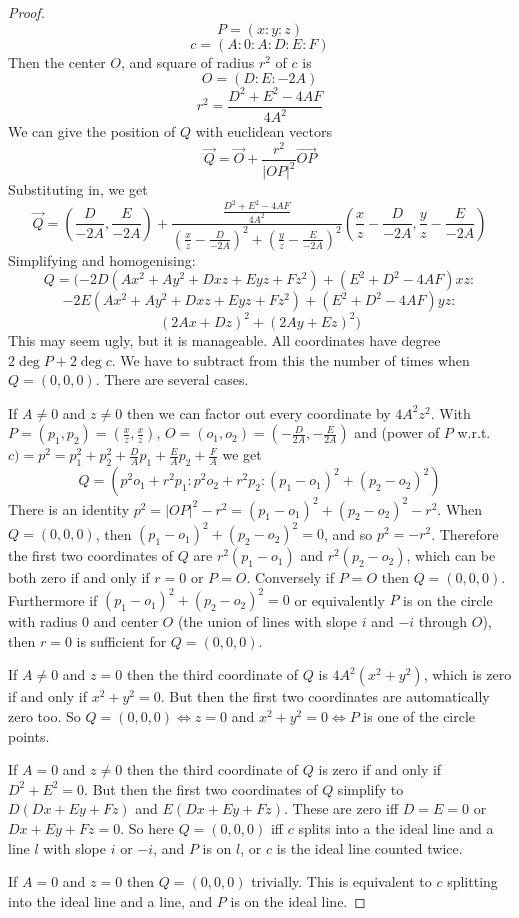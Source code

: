 \documentclass[a4paper]{article}
\begin{document}
\begin{proof}
    $$P=(x:y:z)$$
    $$c=(A:0:A:D:E:F)$$
    Then the center $O$, and square of radius $r^2$ of $c$ is
    $$O=(D:E:-2A)$$
    $$r^2=\frac{D^2+E^2-4AF}{4A^2}$$
    We can give the position of $Q$ with euclidean vectors
    $$\vec{Q}=\vec{O}+\frac{r^2}{|OP|^2}\overrightarrow{OP}$$
    Substituting in, we get
    $$\vec{Q}=\left(\frac{D}{-2A},\frac{E}{-2A}\right)+\frac{\frac{D^2+E^2-4AF}{4A^2}}{\left(\frac{x}{z}-\frac{D}{-2A}\right)^2+\left(\frac{y}{z}-\frac{E}{-2A}\right)^2}\left(\frac{x}{z}-\frac{D}{-2A},\frac{y}{z}-\frac{E}{-2A}\right)$$
    Simplifying and homogenising:
    $$Q=(-2D(Ax^2+Ay^2+Dxz+Eyz+Fz^2)+(E^2+D^2-4AF)xz:$$
    $$-2E(Ax^2+Ay^2+Dxz+Eyz+Fz^2)+(E^2+D^2-4AF)yz:$$
    $$(2Ax+Dz)^2+(2Ay+Ez)^2)$$
    This may seem ugly, but it is manageable. All coordinates have degree $2\deg P+2\deg c$. We have to subtract from this the number of times when $Q=(0,0,0)$. There are several cases.

    If $A\ne 0$ and $z\ne0$ then we can factor out every coordinate by $4A^2z^2$. With $P=(p_1,p_2)=\left(\frac{x}{z},\frac{x}{z}\right)$, $O=(o_1,o_2)=\left(-\frac{D}{2A},-\frac{E}{2A}\right)$ and (power of $P$ w.r.t. $c) = p^2=p_1^2+p_2^2+\frac{D}{A}p_1+\frac{E}{A}p_2+\frac{F}{A}$ we get
    $$Q=(p^2o_1+r^2p_1:p^2o_2+r^2p_2:(p_1-o_1)^2+(p_2-o_2)^2)$$
    There is an identity $p^2=|OP|^2-r^2=(p_1-o_1)^2+(p_2-o_2)^2-r^2$. When $Q=(0,0,0)$, then $(p_1-o_1)^2+(p_2-o_2)^2=0$, and so $p^2=-r^2$. Therefore the first two coordinates of $Q$ are $r^2(p_1-o_1)$ and $r^2(p_2-o_2)$, which can be both zero if and only if $r=0$ or $P=O$. Conversely if $P=O$ then $Q=(0,0,0)$. Furthermore if $(p_1-o_1)^2+(p_2-o_2)^2=0$ or equivalently $P$ is on the circle with radius 0 and center $O$ (the union of lines with slope $i$ and $-i$ through $O$), then $r=0$ is sufficient for $Q=(0,0,0)$.

    If $A\ne 0$ and $z=0$ then the third coordinate of $Q$ is $4A^2(x^2+y^2)$, which is zero if and only if $x^2+y^2=0$. But then the first two coordinates are automatically zero too. So $Q=(0,0,0) \iff z=0$ and $x^2+y^2=0 \iff P$ is one of the circle points.

    If $A=0$ and $z\ne0$ then the third coordinate of $Q$ is zero if and only if $D^2+E^2=0$. But then the first two coordinates of $Q$ simplify to $D(Dx+Ey+Fz)$ and $E(Dx+Ey+Fz)$. These are zero iff $D=E=0$ or $Dx+Ey+Fz=0$. So here $Q=(0,0,0)$ iff $c$ splits into a the ideal line and a line $l$ with slope $i$ or $-i$, and $P$ is on $l$, or $c$ is the ideal line counted twice.

    If $A=0$ and $z=0$ then $Q=(0,0,0)$ trivially. This is equivalent to $c$ splitting into the ideal line and a line, and $P$ is on the ideal line.
\end{proof}
\end{document}
